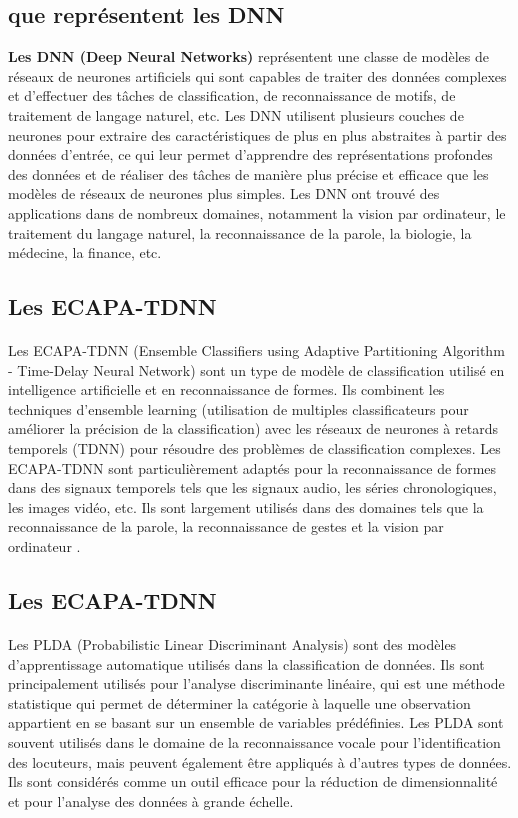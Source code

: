 \subsection{que représentent les DNN}

\textbf{Les DNN (Deep Neural Networks)} représentent une classe de modèles de réseaux de neurones artificiels qui sont capables de traiter des données complexes et d'effectuer des tâches de classification, de reconnaissance de motifs, de traitement de langage naturel, etc. Les DNN utilisent plusieurs couches de neurones pour extraire des caractéristiques de plus en plus abstraites à partir des données d'entrée, ce qui leur permet d'apprendre des représentations profondes des données et de réaliser des tâches de manière plus précise et efficace que les modèles de réseaux de neurones plus simples. Les DNN ont trouvé des applications dans de nombreux domaines, notamment la vision par ordinateur, le traitement du langage naturel, la reconnaissance de la parole, la biologie, la médecine, la finance, etc.

\subsection{Les ECAPA-TDNN }
\paragraph{}Les ECAPA-TDNN (Ensemble Classifiers using Adaptive Partitioning Algorithm - Time-Delay Neural Network) sont un type de modèle de classification utilisé en intelligence artificielle et en reconnaissance de formes. Ils combinent les techniques d'ensemble learning (utilisation de multiples classificateurs pour améliorer la précision de la classification) avec les réseaux de neurones à retards temporels (TDNN) pour résoudre des problèmes de classification complexes. Les ECAPA-TDNN sont particulièrement adaptés pour la reconnaissance de formes dans des signaux temporels tels que les signaux audio, les séries chronologiques, les images vidéo, etc. Ils sont largement utilisés dans des domaines tels que la reconnaissance de la parole, la reconnaissance de gestes et la vision par ordinateur \cite{embeddings}.

\subsection{Les ECAPA-TDNN }
\paragraph{}Les PLDA (Probabilistic Linear Discriminant Analysis) sont des modèles d'apprentissage automatique utilisés dans la classification de données. Ils sont principalement utilisés pour l'analyse discriminante linéaire, qui est une méthode statistique qui permet de déterminer la catégorie à laquelle une observation appartient en se basant sur un ensemble de variables prédéfinies. Les PLDA sont souvent utilisés dans le domaine de la reconnaissance vocale pour l'identification des locuteurs, mais peuvent également être appliqués à d'autres types de données. Ils sont considérés comme un outil efficace pour la réduction de dimensionnalité et pour l'analyse des données à grande échelle.

